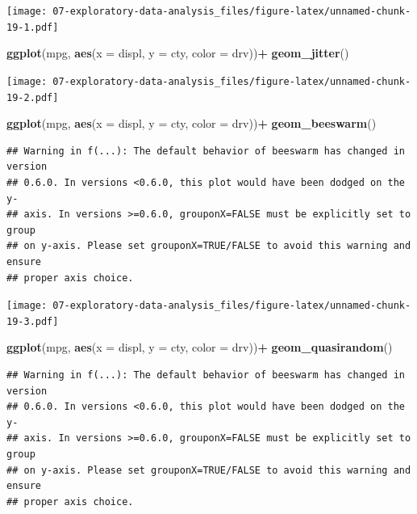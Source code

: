 \documentclass[]{book}
\newenvironment{Shaded}{\begin{snugshade}}{\end{snugshade}}
\newcommand{\DataTypeTok}[1]{\textcolor[rgb]{0.13,0.29,0.53}{#1}}
\newcommand{\KeywordTok}[1]{\textcolor[rgb]{0.13,0.29,0.53}{\textbf{#1}}}
\newcommand{\NormalTok}[1]{#1}
\newcommand{\OperatorTok}[1]{\textcolor[rgb]{0.81,0.36,0.00}{\textbf{#1}}}
\newcommand{\StringTok}[1]{\textcolor[rgb]{0.31,0.60,0.02}{#1}}
\theoremstyle{definition}
\theoremstyle{definition}
\theoremstyle{definition}
\theoremstyle{remark}
\begin{document}
\texttt{[image: 07-exploratory-data-analysis\_files/figure-latex/unnamed-chunk-19-1.pdf]}

\begin{Shaded}
\begin{Highlighting}[]
\KeywordTok{ggplot}\NormalTok{(mpg, }\KeywordTok{aes}\NormalTok{(}\DataTypeTok{x =}\NormalTok{ displ, }\DataTypeTok{y =}\NormalTok{ cty, }\DataTypeTok{color =}\NormalTok{ drv))}\OperatorTok{+}
\StringTok{  }\KeywordTok{geom_jitter}\NormalTok{()}
\end{Highlighting}
\end{Shaded}

\texttt{[image: 07-exploratory-data-analysis\_files/figure-latex/unnamed-chunk-19-2.pdf]}

\begin{Shaded}
\begin{Highlighting}[]
\KeywordTok{ggplot}\NormalTok{(mpg, }\KeywordTok{aes}\NormalTok{(}\DataTypeTok{x =}\NormalTok{ displ, }\DataTypeTok{y =}\NormalTok{ cty, }\DataTypeTok{color =}\NormalTok{ drv))}\OperatorTok{+}
\StringTok{  }\KeywordTok{geom_beeswarm}\NormalTok{()}
\end{Highlighting}
\end{Shaded}

\begin{verbatim}
## Warning in f(...): The default behavior of beeswarm has changed in version
## 0.6.0. In versions <0.6.0, this plot would have been dodged on the y-
## axis. In versions >=0.6.0, grouponX=FALSE must be explicitly set to group
## on y-axis. Please set grouponX=TRUE/FALSE to avoid this warning and ensure
## proper axis choice.
\end{verbatim}

\texttt{[image: 07-exploratory-data-analysis\_files/figure-latex/unnamed-chunk-19-3.pdf]}

\begin{Shaded}
\begin{Highlighting}[]
\KeywordTok{ggplot}\NormalTok{(mpg, }\KeywordTok{aes}\NormalTok{(}\DataTypeTok{x =}\NormalTok{ displ, }\DataTypeTok{y =}\NormalTok{ cty, }\DataTypeTok{color =}\NormalTok{ drv))}\OperatorTok{+}
\StringTok{  }\KeywordTok{geom_quasirandom}\NormalTok{()}
\end{Highlighting}
\end{Shaded}

\begin{verbatim}
## Warning in f(...): The default behavior of beeswarm has changed in version
## 0.6.0. In versions <0.6.0, this plot would have been dodged on the y-
## axis. In versions >=0.6.0, grouponX=FALSE must be explicitly set to group
## on y-axis. Please set grouponX=TRUE/FALSE to avoid this warning and ensure
## proper axis choice.
\end{verbatim}
\end{document}
